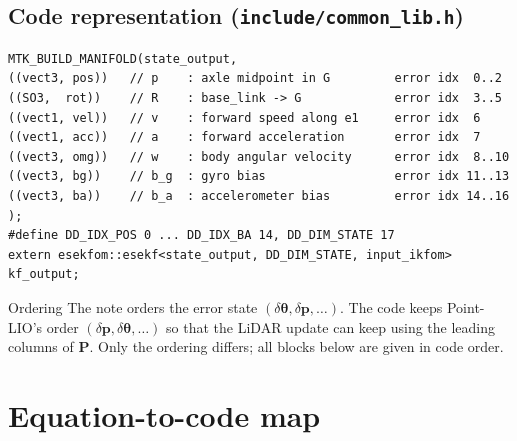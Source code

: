 \documentclass[11pt,a4paper]{article}
\newcommand{\f}[1]{\texttt{#1}}
\newcommand{\p}{\mathbf{p}}
\begin{document}
\subsection{Code representation (\f{include/common\_lib.h})}

\begin{lstlisting}
MTK_BUILD_MANIFOLD(state_output,
((vect3, pos))   // p    : axle midpoint in G         error idx  0..2
((SO3,  rot))    // R    : base_link -> G             error idx  3..5
((vect1, vel))   // v    : forward speed along e1     error idx  6
((vect1, acc))   // a    : forward acceleration       error idx  7
((vect3, omg))   // w    : body angular velocity      error idx  8..10
((vect3, bg))    // b_g  : gyro bias                  error idx 11..13
((vect3, ba))    // b_a  : accelerometer bias         error idx 14..16
);
#define DD_IDX_POS 0 ... DD_IDX_BA 14, DD_DIM_STATE 17
extern esekfom::esekf<state_output, DD_DIM_STATE, input_ikfom> kf_output;
\end{lstlisting}

\begin{note}{Ordering}
The note orders the error state $(\delta\bm\theta,\delta\p,\dots)$. The code keeps
Point-LIO's order $(\delta\p,\delta\bm\theta,\dots)$ so that the LiDAR update can
keep using the leading columns of $\mathbf P$. Only the ordering differs; all
blocks below are given in code order.
\end{note}

\section{Equation-to-code map}
\end{document}
